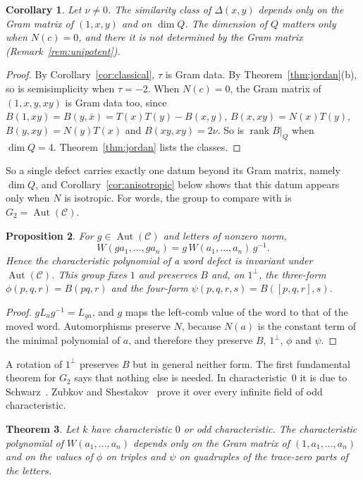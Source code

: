 \documentclass[11pt]{amsart}
\newtheorem{theorem}{Theorem}[section]
\newtheorem{proposition}[theorem]{Proposition}
\newtheorem{corollary}[theorem]{Corollary}
\theoremstyle{definition}
\theoremstyle{remark}
\newcommand{\C}{\mathcal{C}}
\newcommand{\conj}[1]{\overline{#1}}
\newcommand{\assoc}[3]{[#1,#2,#3]}
\DeclareMathOperator{\rank}{rank}
\begin{document}
\begin{corollary}\label{cor:gram-dimq}
Let $\nu\neq0$. The similarity class of $\Delta(x,y)$ depends only on the Gram
matrix of $(1,x,y)$ and on $\dim Q$. The dimension of $Q$ matters only when
$N(c)=0$, and there it is not determined by the Gram matrix
(Remark~\ref{rem:unipotent}).
\end{corollary}

\begin{proof}
By Corollary~\ref{cor:classical}, $\tau$ is Gram data. By
Theorem~\ref{thm:jordan}(b), so is semisimplicity when $\tau=-2$. When
$N(c)=0$, the Gram matrix of $(1,x,y,xy)$ is Gram data too, since
$B(1,xy)=B(y,\conj x)=T(x)T(y)-B(x,y)$, $B(x,xy)=N(x)T(y)$,
$B(y,xy)=N(y)T(x)$ and $B(xy,xy)=2\nu$. So is $\rank B|_Q$ when $\dim Q=4$.
Theorem~\ref{thm:jordan} lists the classes.
\end{proof}

So a single defect carries exactly one datum beyond its Gram matrix, namely
$\dim Q$, and Corollary~\ref{cor:anisotropic} below shows that this datum
appears only when $N$ is isotropic. For words, the group to compare with is
$G_2=\operatorname{Aut}(\C)$.

\begin{proposition}\label{prop:equivariant}
For $g\in\operatorname{Aut}(\C)$ and letters of nonzero norm,
\[
  W(ga_1,\dots,ga_n)=g\,W(a_1,\dots,a_n)\,g^{-1}.
\]
Hence the characteristic polynomial of a word defect is invariant under
$\operatorname{Aut}(\C)$. This group fixes $1$ and preserves $B$ and, on
$1^\perp$, the three-form $\phi(p,q,r)=B(pq,r)$ and the four-form
$\psi(p,q,r,s)=B(\assoc pqr,s)$.
\end{proposition}

\begin{proof}
$gL_ag^{-1}=L_{ga}$, and $g$ maps the left-comb value of the word to that of
the moved word. Automorphisms preserve $N$, because $N(a)$ is the constant
term of the minimal polynomial of $a$, and therefore they preserve $B$, $1^\perp$, $\phi$ and
$\psi$.
\end{proof}

A rotation of $1^\perp$ preserves $B$ but in general neither form. The first
fundamental theorem for $G_2$ says that nothing else is needed. In
characteristic~$0$ it is due to Schwarz~\cite{schwarz1988}. Zubkov and
Shestakov~\cite[Cor.~7.11, Rem.~7.12]{zubkov-shestakov} prove it over every
infinite field of odd characteristic.

\begin{theorem}\label{conj:g2}
Let $k$ have characteristic $0$ or odd characteristic. The characteristic
polynomial of $W(a_1,\dots,a_n)$ depends only on the Gram matrix of
$(1,a_1,\dots,a_n)$ and on the values of $\phi$ on triples and $\psi$ on
quadruples of the trace-zero parts of the letters.
\end{theorem}
\end{document}
